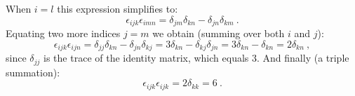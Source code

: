 When $i=l$ this expression simplifies to:
\begin{equation}
	\epsilon_{ijk}\epsilon_{imn} = \delta_{jm}\delta_{kn}-\delta_{jn}\delta_{km}\ .
\end{equation}
Equating two more indices $j=m$ we obtain (summing over both $i$ and $j$):
\begin{equation}
	\epsilon_{ijk}\epsilon_{ijn} = \delta_{jj}\delta_{kn}-\delta_{jn}\delta_{kj} = 3\delta_{kn}-\delta_{kj}\delta_{jn}=3\delta_{kn}-\delta_{kn}=2\delta_{kn}\ ,
\end{equation}
since $\delta_{jj}$ is the trace of the identity matrix, which equals $3$.
And finally (a triple summation):
\begin{equation}
	\epsilon_{ijk}\epsilon_{ijk} = 2\delta_{kk} = 6\ .
\end{equation}







